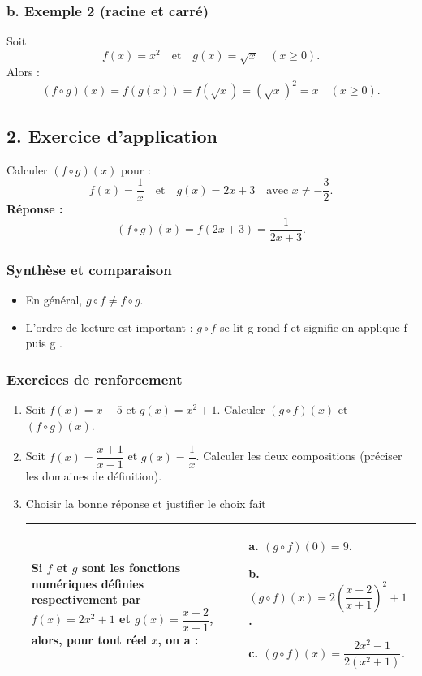 \documentclass[12pt,a4paper]{article}
\begin{document}
\subsubsection*{\color{myred} b. Exemple 2 (racine et carré) }
Soit 
\[
f(x) = x^2 \quad \text{et} \quad g(x) = \sqrt{x} \quad (x \ge 0).
\]
Alors :
\[
(f \circ g)(x) = f(g(x)) = f(\sqrt{x}) = (\sqrt{x})^2 = x \quad (x \ge 0).
\]

\subsection*{\color{myred} 2. Exercice d’application }
Calculer \( (f \circ g)(x) \) pour :
\[
f(x) = \frac{1}{x} \quad \text{et} \quad g(x) = 2x + 3 \quad \text{avec } x \neq -\frac{3}{2}.
\]
\textbf{Réponse :}
\[
(f \circ g)(x) = f(2x+3) = \frac{1}{2x+3}.
\]

\newpage

\subsubsection*{Synthèse et comparaison}
\begin{itemize}
    \item En général, \( g \circ f \neq f \circ g \).
    \item L'ordre de lecture est important : \( g \circ f \) se lit \og{} g rond f \fg{} et signifie \og on applique f puis g \fg.
\end{itemize}

\subsubsection*{Exercices de renforcement}
\begin{enumerate}
    \item Soit \( f(x) = x - 5 \) et \( g(x) = x^2 + 1 \). Calculer \( (g \circ f)(x) \) et \( (f \circ g)(x) \).
    \item Soit \( f(x) = \dfrac{x+1}{x-1} \) et \( g(x) = \dfrac{1}{x} \). Calculer les deux compositions (préciser les domaines de définition).
\item Choisir la bonne réponse et justifier le choix fait

\begin{table}[h]
\centering
\begin{tabular}{|m{7cm}|m{6cm}|}
\hline
 Si $f$ et $g$ sont les fonctions numériques définies respectivement par $f(x) = 2x^2 + 1$ et $g(x) = \dfrac{x-2}{x+1}$, alors, pour tout réel $x$, on a : 
& 
\begin{enumerate}
    \item[a.] $(g \circ f)(0) = 9$.
    \item[b.] $(g \circ f)(x) = 2\left(\dfrac{x-2}{x+1}\right)^2 + 1$.
    \item[c.] $(g \circ f)(x) = \dfrac{2x^2 - 1}{2(x^2 + 1)}$.
\end{enumerate} \\
\hline
\end{tabular}
\end{table}
    
\end{enumerate}
\end{document}
